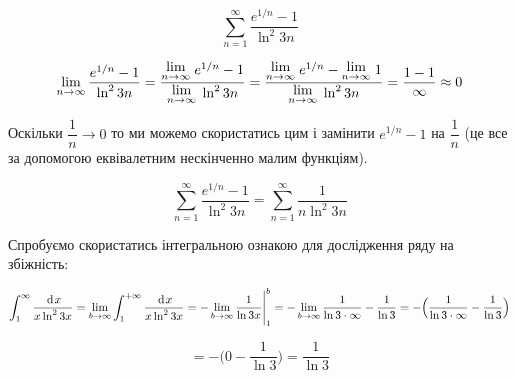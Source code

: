 {}

$$
\sum_{n=1}^\infty \dfrac{e^{1/n}-1}{\ln^2{3n}}
$$

$$
\lim_{n \to \infty} \dfrac{e^{1/n}-1}{\ln^2{3n}}
= \dfrac{\Lim{n \to \infty} e^{1/n}-1 }{\Lim{n \to \infty} \ln^2{3n}}
= \dfrac{\Lim{n \to \infty} e^{1/n}- \Lim{n \to \infty} 1  }{\Lim{n \to \infty} \ln^2{3n}} = \dfrac{1-1}{\infty} \approx 0
$$


 Оскільки $\dfrac{1}{n} \to 0$ то ми можемо скористатись цим і замінити $e^{1/n}-1$ на $\dfrac{1}{n}$ (це все за допомогою еквівалетним нескінченно малим функціям).

$$
  \sum_{n=1}^\infty \dfrac{e^{1/n}-1}{\ln^2{3n}}
= \sum_{n=1}^\infty \dfrac{1}{n\ln^2{3n}}
$$

Спробуємо скористатись інтегральною ознакою для дослідження ряду на збіжність:

$$
  \int_{1}^\infty \dfrac{\hspace{2pt}\text{d}\hspace{1pt}{x}}{x\ln^2{3x}}
= \lim_{b \to \infty} \int^{+\infty}_1 \dfrac{\hspace{2pt}\text{d}\hspace{1pt}{x}}{x\ln^2{3x}}
= - \lim_{b \to \infty} \dfrac{1}{\ln{3x}} \Bigg|^b_1
= - \lim_{b \to \infty} \dfrac{1}{\ln{3 \cdot \infty }} - \dfrac{1}{\ln{3}}
= - \Big( \dfrac{1}{\ln{3 \cdot \infty }} - \dfrac{1}{\ln{3}} \Big)
$$

$$
= - \Big( 0 - \dfrac{1}{\ln{3}} \Big) = \boxed{\dfrac{1}{\ln{3}}}
$$


